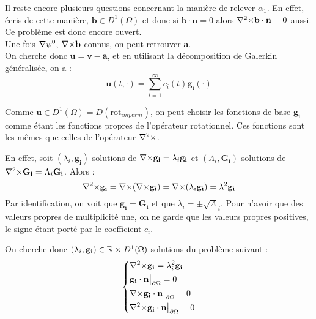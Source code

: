 Il reste encore plusieurs questions concernant la manière de relever $\alpha_1$. En effet, écris de cette manière, $\mathbf{b}\in D^1(\Omega)$ et donc si $\mathbf{b}\cdot\mathbf{n}=0$ alors ${\nabla^2\times}\mathbf{b}\cdot\mathbf{n}=0$ aussi. Ce problème est donc encore ouvert.\\

Une fois ${\nabla}\psi^0$, ${\nabla\times} \mathbf{b}$ connus, on peut retrouver $\mathbf{a}$.\\

On cherche donc $\mathbf{u}=\mathbf{v}-\mathbf{a}$, et en utilisant la décomposition de Galerkin généralisée, on a :
\begin{equation}\label{u}
\mathbf{u}(t,\cdot) = \sum_{i=1}^{\infty} c_i(t)\mathbf{g_i}(\cdot)
\end{equation}

Comme $\mathbf{u}\in D^1(\Omega)=D(\mathrm{rot}_{imperm})$, on peut choisir les fonctions de base
$\mathbf{g_i}$ comme étant les fonctions propres de l'opérateur rotationnel. Ces
fonctions sont les mêmes que celles de l'opérateur ${\nabla^2\times}$.

En effet, soit $(\lambda_i,\mathbf{g_i})$ solutions de ${\nabla\times} \mathbf{g_i} = \lambda_i\mathbf{g_i}$ et $(\Lambda_i,\mathbf{G_i})$ solutions de ${\nabla^2\times} \mathbf{G_i} = \Lambda_i\mathbf{G_i}$. Alors :
\[ {\nabla^2\times} \mathbf{g_i} = {\nabla\times}({\nabla\times} \mathbf{g_i})={\nabla\times}(\lambda_i\mathbf{g_i})=\lambda^2\mathbf{g_i} \]
Par identification, on voit que $\mathbf{g_i}=\mathbf{G_i}$ et que $\lambda_i=\pm\sqrt\Lambda_i$. Pour n'avoir que des valeurs propres de multiplicité une, on ne garde que les valeurs propres positives, le signe étant porté par le coefficient $c_i$.

On cherche donc $(\lambda_i,\mathbf{g_i})\in{\mathbb{R}}\times D^1(\Omega)$ solutions du problème suivant :
\begin{equation}\label{curlcurl}
\left\{\begin{aligned}
&{\nabla^2\times}  \mathbf{g_i} = \lambda_i^2 \mathbf{g_i}\\
&\mathbf{g_i}\cdot \mathbf{n}{\big\rvert_{\partial\Omega}} = 0\\
&{\nabla\times} \mathbf{g_i}\cdot \mathbf{n}{\big\rvert_{\partial\Omega}} = 0\\
&{\nabla^2\times}  \mathbf{g_i}\cdot \mathbf{n}{\big\rvert_{\partial\Omega}} = 0
\end{aligned}\right.
\end{equation}


